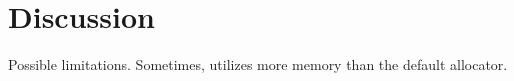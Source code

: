 \section{Discussion}

Possible limitations. Sometimes, \NM{} utilizes more memory than the default allocator. 